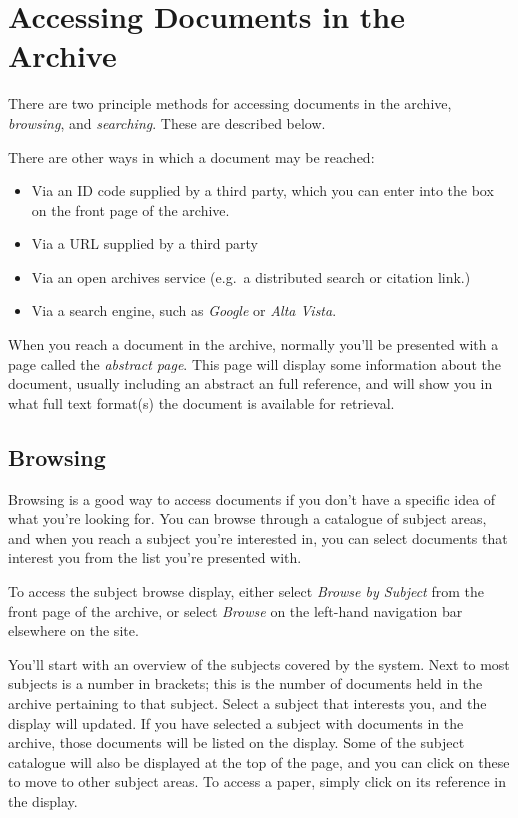 
\section{Accessing Documents in the Archive}

There are two principle methods for accessing documents in the archive, \emph{browsing}, and \emph{searching}. These are described below.

There are other ways in which a document may be reached:

\begin{itemize}
\item Via an ID code supplied by a third party, which you can enter into the box on the front page of the archive.
\item Via a URL supplied by a third party
\item Via an open archives service (e.g.\ a distributed search or citation link.)
\item Via a search engine, such as \emph{Google} or \emph{Alta Vista}.
\end{itemize}

When you reach a document in the archive, normally you'll be presented with a page called the \emph{abstract page}. This page will display some information about the document, usually including an abstract an full reference, and will show you in what full text format(s) the document is available for retrieval.


\subsection{Browsing}

Browsing is a good way to access documents if you don't have a specific idea of what you're looking for. You can browse through a catalogue of subject areas, and when you reach a subject you're interested in, you can select documents that interest you from the list you're presented with.

To access the subject browse display, either select \emph{Browse by Subject} from the front page of the archive, or select \emph{Browse} on the left-hand navigation bar elsewhere on the site.

You'll start with an overview of the subjects covered by the system. Next to most subjects is a number in brackets; this is the number of documents held in the archive pertaining to that subject. Select a subject that interests you, and the display will updated. If you have selected a subject with documents in the archive, those documents will be listed on the display. Some of the subject catalogue will also be displayed at the top of the page, and you can click on these to move to other subject areas. To access a paper, simply click on its reference in the display.

